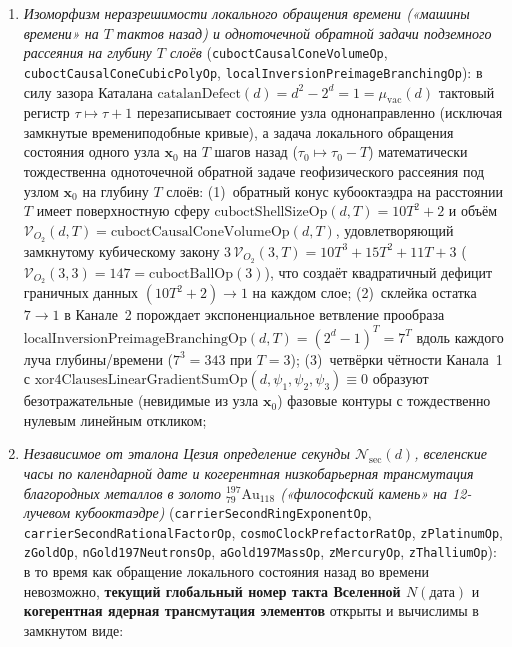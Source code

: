 \begin{theorem}
\begin{enumerate}[label=\textbf{(\roman*)},leftmargin=*]
\begin{itemize}[noitemsep,leftmargin=*]
\begin{enumerate}[label=(\alph*),noitemsep]
    \item \emph{Изоморфизм неразрешимости локального обращения времени («машины времени» на $T$ тактов назад) и одноточечной обратной задачи подземного рассеяния на глубину $T$ слоёв} (\texttt{cuboctCausalConeVolumeOp}, \texttt{cuboctCausalConeCubicPolyOp}, \texttt{localInversionPreimageBranchingOp}):
      в силу зазора Каталана $\mathrm{catalanDefect}(d) = d^2-2^d = 1 = \mu_{\mathrm{vac}}(d)$ тактовый регистр $\tau\mapsto\tau+1$ перезаписывает состояние узла однонаправленно (исключая замкнутые времениподобные кривые), а задача локального обращения состояния одного узла $\mathbf{x}_0$ на $T$ шагов назад ($\tau_0\mapsto\tau_0-T$) математически тождественна одноточечной обратной задаче геофизического рассеяния под узлом $\mathbf{x}_0$ на глубину $T$ слоёв:
      (1)~обратный конус кубооктаэдра на расстоянии $T$ имеет поверхностную сферу $\mathrm{cuboctShellSizeOp}(d,T) = 10T^2+2$ и объём $\mathcal{V}_{O_2}(d,T) = \mathrm{cuboctCausalConeVolumeOp}(d,T)$, удовлетворяющий замкнутому кубическому закону $3\,\mathcal{V}_{O_2}(3,T) = 10T^3+15T^2+11T+3$ ($\mathcal{V}_{O_2}(3,3)=147=\mathrm{cuboctBallOp}(3)$), что создаёт квадратичный дефицит граничных данных $(10T^2+2)\to 1$ на каждом слое;
      (2)~склейка остатка $7\to 1$ в Канале~2 порождает экспоненциальное ветвление прообраза $\mathrm{localInversionPreimageBranchingOp}(d,T) = (2^d-1)^T = 7^T$ вдоль каждого луча глубины/времени ($7^3=343$ при $T=3$);
      (3)~четвёрки чётности Канала~1 с $\mathrm{xor4ClausesLinearGradientSumOp}(d,\psi_1,\psi_2,\psi_3)\equiv 0$ образуют безотражательные (невидимые из узла $\mathbf{x}_0$) фазовые контуры с тождественно нулевым линейным откликом;
    \item \emph{Независимое от эталона Цезия определение секунды $\mathcal{N}_{\mathrm{sec}}(d)$, вселенские часы по календарной дате и когерентная низкобарьерная трансмутация благородных металлов в золото $^{197}_{79}\mathrm{Au}_{118}$ («философский камень» на 12-лучевом кубооктаэдре)} (\texttt{carrierSecondRingExponentOp}, \texttt{carrierSecondRationalFactorOp}, \texttt{cosmoClockPrefactorRatOp}, \texttt{zPlatinumOp}, \texttt{zGoldOp}, \texttt{nGold197NeutronsOp}, \texttt{aGold197MassOp}, \texttt{zMercuryOp}, \texttt{zThalliumOp}):
      в то время как обращение локального состояния назад во времени невозможно, \textbf{текущий глобальный номер такта Вселенной $N(\text{дата})$} и \textbf{когерентная ядерная трансмутация элементов} открыты и вычислимы в замкнутом виде:

\end{enumerate}
\end{itemize}
\end{enumerate}
\end{theorem}
